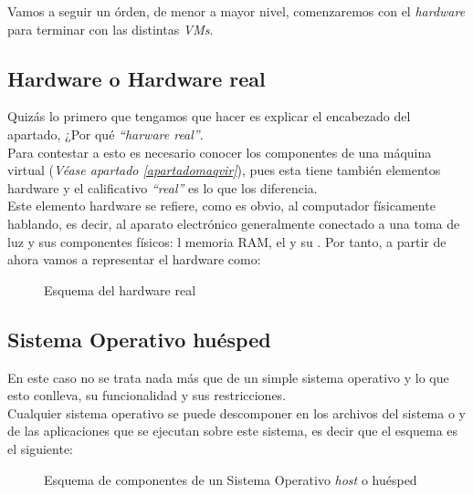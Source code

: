 Vamos a seguir un órden, de menor a mayor nivel, comenzaremos con el \emph{hardware} para terminar con las distintas \emph{VMs}.

\subsection{Hardware o Hardware real}
Quizás lo primero que tengamos que hacer es explicar el encabezado del apartado, ¿Por qué \emph{\textquotedblleft harware real\textquotedblright}.\\
Para contestar a esto es necesario conocer los componentes de una máquina virtual (\textit{Véase apartado \ref{apartadomaqvir}}), pues esta tiene también elementos hardware y el calificativo \emph{\textquotedblleft real\textquotedblright} es lo que los diferencia.\\

Este elemento hardware se refiere, como es obvio, al computador físicamente hablando, es decir, al aparato electrónico generalmente conectado a una toma de luz y sus componentes físicos: l memoria RAM, el   y su . Por tanto, a partir de ahora vamos a representar el hardware como:

\begin{figure}[H]
\begin{center}
\end{center}
\caption[Hardware Real]{Esquema del hardware real}
\end{figure}

\subsection{Sistema Operativo huésped}\label{sohost}
En este caso no se trata nada más que de un simple sistema operativo y lo que esto conlleva, su funcionalidad y sus restricciones.\\

Cualquier sistema operativo se puede descomponer en los archivos del sistema o \emph{} y de las aplicaciones que se ejecutan sobre este sistema, es decir que el esquema es el siguiente:

\begin{figure}[H]
\begin{center}
\end{center}
\caption[Sistema Operativo huésped]{Esquema de componentes de un Sistema Operativo \emph{host} o huésped}
\end{figure}

